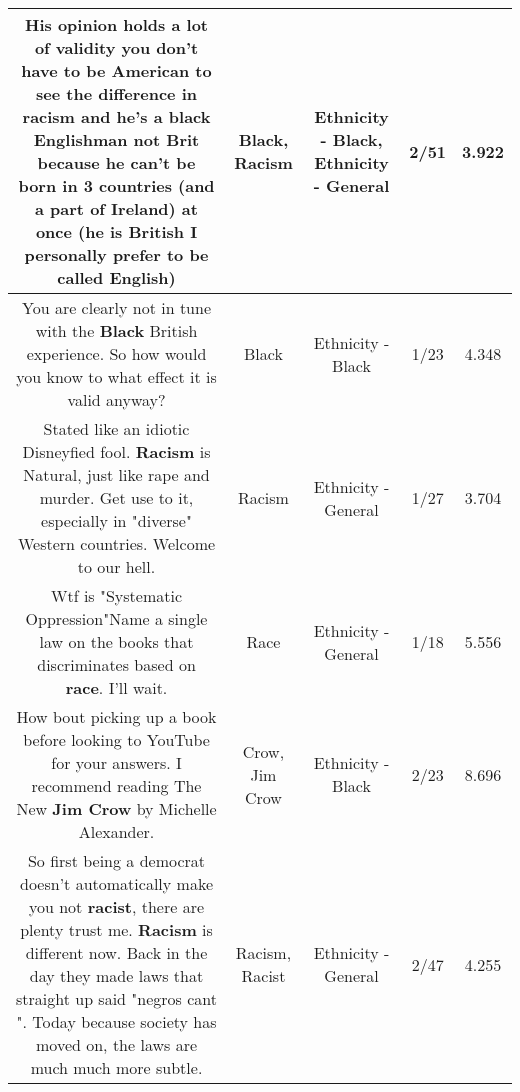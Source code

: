 \documentclass[11pt]{article}
\newlength\mylength
\begin{document}
\begin{center}
\begin{longtable}{|C{.65\mylength}|C{.30\mylength}|C{.12\mylength}|C{.12\mylength}|C{.12\mylength}|}
  \small His opinion holds a lot of validity you don't have to be American to see the difference in \textbf{racism} and he's a \textbf{black} Englishman not Brit because he can't be born in 3 countries (and a part of Ireland) at once (he is British I personally prefer to be called English)\normalsize   & Black, Racism & Ethnicity - Black, Ethnicity - General & 2/51 & 3.922 \\  \hline
  \small You are clearly not in tune with the \textbf{Black} British experience. So how would you know to what effect it is valid anyway?\normalsize   & Black & Ethnicity - Black & 1/23 & 4.348 \\  \hline
  \small Stated like an idiotic Disneyfied fool.  \textbf{Racism} is Natural, just like rape and murder. Get use to it, especially in "diverse" Western countries.  Welcome to our hell.\normalsize   & Racism & Ethnicity - General & 1/27 & 3.704 \\  \hline
  \small Wtf is "Systematic Oppression"Name a single law on the books that discriminates based on \textbf{race}. I'll wait.\normalsize   & Race & Ethnicity - General & 1/18 & 5.556 \\  \hline
  \small How bout picking up a book before looking to YouTube for your answers. I recommend reading The New \textbf{Jim C\textbf{row}} by Michelle Alexander.\normalsize   & Crow, Jim Crow & Ethnicity - Black & 2/23 & 8.696 \\  \hline
  \small So first being a democrat doesn't automatically make you not \textbf{racist}, there are plenty trust me. \textbf{Racism} is different now. Back in the day they made laws that straight up said "negros cant  ". Today because society has moved on, the laws are much much more subtle.\normalsize   & Racism, Racist & Ethnicity - General & 2/47 & 4.255 \\  \hline

\end{longtable}
\end{center}
\end{document}

